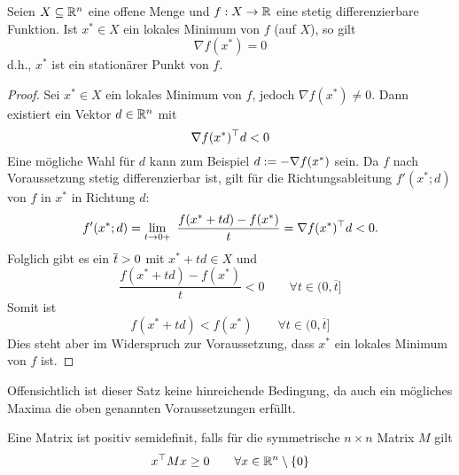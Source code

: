 \begin{satz} \label{satz 1.3_2.1}
	Seien $ X \subseteq \mathbb{R}^n $ eine offene Menge und $ f:X \to \mathbb{R} $ eine stetig differenzierbare Funktion. Ist  $ x^\ast \in X $ ein lokales Minimum von $f$ (auf $X$), so gilt 
	\begin{equation*}
		\nabla f(x^\ast) = 0 
	\end{equation*}
	d.h., $x^\ast$ ist ein stationärer Punkt von $f$. 
\end{satz}
\begin{proof}
	Sei $ x^\ast \in X $ ein lokales Minimum von $f$, jedoch $\nabla f(x^\ast) \ne 0 $. Dann existiert ein Vektor $d \in \mathbb{R}^{n} $ mit 
	\begin{equation*}
		\nabla f(x^\ast)^{\top} d < 0
	\end{equation*}
	Eine mögliche Wahl für $d$ kann zum Beispiel $d \mathrel{:=} -\nabla f(x^\ast)$ sein. Da $f$ nach Voraussetzung stetig differenzierbar ist, gilt für die Richtungsableitung $f'(x^\ast;d)$ von $f$ in $ x^\ast$ in Richtung $d$: 
	\begin{equation*}
		f'(x^\ast;d) = \lim_{t \to 0+}\ \dfrac{f(x^\ast + td) - f(x^\ast)}{t} = \nabla \trans{f(x^\ast)} d < 0. 
	\end{equation*}
	Folglich gibt es ein $\overline{t} >0 $ mit $ x^\ast +td \in X$ und 
	\begin{equation*}
		\dfrac{f(x^\ast+td) - f(x^\ast)}{t}<0 \qquad \forall t \in (0,\overline{t} ] 
	\end{equation*}
	Somit ist 
	\begin{equation*}
		f(x^\ast+td)<f(x^\ast) \qquad \forall t \in (0,\overline{t} ]
	\end{equation*}
	Dies steht aber im Widerspruch zur Voraussetzung, dass $x^\ast$ ein lokales Minimum von $f$ ist.
\end{proof}

\begin{bemerkung}
	Offensichtlich ist dieser Satz keine hinreichende Bedingung, da auch ein mögliches Maxima die oben genannten Voraussetzungen erfüllt.
\end{bemerkung}

\begin{erinnerung}
	Eine Matrix ist positiv semidefinit, falls für die symmetrische $ n \times n$ Matrix $M$ gilt 
	\begin{equation}
		x^{\top}Mx \ge 0 \qquad \forall x \in \mathbb{R}^{n} \setminus \left\{ 0 \right\}
		\label{definit}
	\end{equation}
\end{erinnerung}

